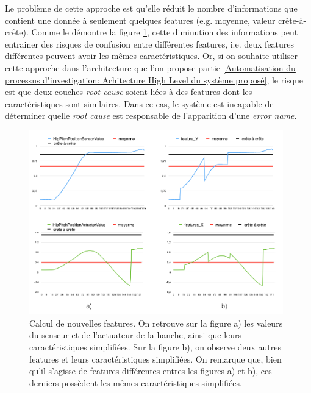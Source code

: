 Le problème de cette approche est qu'elle réduit le nombre d'informations que contient une donnée à seulement quelques features (e.g. moyenne, valeur crête-à-crête). Comme le démontre la figure \ref{fig:Comparaison de deux caractéristiques}, cette diminution des informations peut entrainer des risques de confusion entre différentes features, i.e. deux features différentes peuvent avoir les mêmes caractéristiques. Or, si on souhaite utiliser cette approche dans l'architecture que l'on propose partie \ref{Automatisation du processus d'investigation: Achitecture High Level du système proposé}, le risque est que deux couches \emph{root cause} soient liées à des features dont les caractéristiques sont similaires. Dans ce cas, le système est incapable de déterminer quelle \emph{root cause} est responsable de l'apparition d'une \emph{error name}.

\begin{figure}[h]
	\centering\includegraphics[height=8cm]{images/caracteristiques_simples_2.png}
	\caption[Comparaison de deux caractéristiques]{Calcul de nouvelles features. On retrouve sur la figure a) les valeurs du senseur et de l'actuateur de la hanche, ainsi que leurs caractéristiques simplifiées. Sur la figure b), on observe deux autres features et leurs caractéristiques simplifiées. On remarque que, bien qu'il s'agisse de features différentes entres les figures a) et b), ces derniers possèdent les mêmes caractéristiques simplifiées.}
	\label{fig:Comparaison de deux caractéristiques}
\end{figure}

